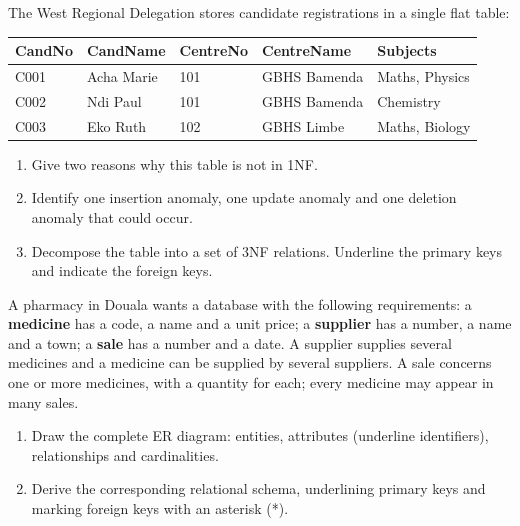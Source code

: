 \documentclass[11pt]{article}
\begin{document}
\begin{exercice}
The West Regional Delegation stores candidate registrations in a single flat table:
\begin{center}
\begin{tabularx}{\linewidth}{|l|X|l|l|l|}
\hline
\rowcolor{popblueL} \textbf{CandNo} & \textbf{CandName} & \textbf{CentreNo} & \textbf{CentreName} & \textbf{Subjects} \\
\hline
C001 & Acha Marie & 101 & GBHS Bamenda & Maths, Physics \\
\hline
C002 & Ndi Paul & 101 & GBHS Bamenda & Chemistry \\
\hline
C003 & Eko Ruth & 102 & GBHS Limbe & Maths, Biology \\
\hline
\end{tabularx}
\end{center}
\begin{enumerate}
\item Give two reasons why this table is not in 1NF.
\item Identify one insertion anomaly, one update anomaly and one deletion anomaly that could occur.
\item Decompose the table into a set of 3NF relations. Underline the primary keys and indicate the foreign keys.
\end{enumerate}
\end{exercice}

\begin{exercice}
A pharmacy in Douala wants a database with the following requirements: a \textbf{medicine} has a code, a name and a unit price; a \textbf{supplier} has a number, a name and a town; a \textbf{sale} has a number and a date. A supplier supplies several medicines and a medicine can be supplied by several suppliers. A sale concerns one or more medicines, with a quantity for each; every medicine may appear in many sales.
\begin{enumerate}
\item Draw the complete ER diagram: entities, attributes (underline identifiers), relationships and cardinalities.
\item Derive the corresponding relational schema, underlining primary keys and marking foreign keys with an asterisk (*).
\end{enumerate}
\end{exercice}
\end{document}
